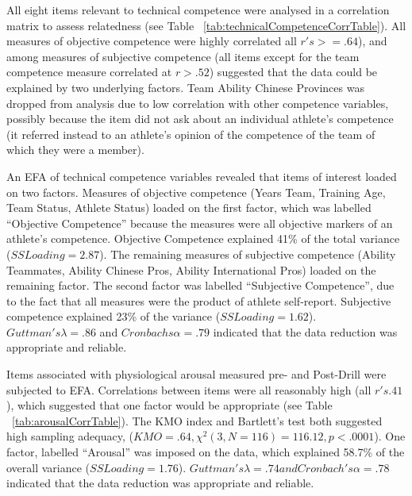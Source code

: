 All eight items relevant to technical competence were analysed in a correlation matrix to assess relatedness (see Table ~\ref{tab:technicalCompetenceCorrTable}). All measures of objective competence were highly correlated all $r's >= .64$),  and among measures of subjective competence (all items except for the team competence measure correlated at $r > .52$) suggested that the data could be explained by two underlying factors. Team Ability Chinese Provinces was dropped from analysis due to low correlation with other competence variables, possibly because the item did not ask about an individual athlete’s competence (it referred instead to an athlete’s opinion of the competence of the team of which they were a member).

An EFA of technical competence variables revealed that items of interest loaded on two factors. Measures of objective competence (Years Team, Training Age, Team Status, Athlete Status) loaded on the first factor, which was labelled ``Objective Competence'' because the measures were all objective markers of an athlete's competence.
Objective Competence explained 41\% of the total variance ($SS Loading = 2.87$).  The remaining measures of subjective competence (Ability Teammates, Ability Chinese Pros, Ability International Pros) loaded on the remaining factor.  The second factor was labelled ``Subjective Competence'', due to the fact that all measures were the product of athlete self-report.  Subjective competence explained 23\% of the variance ($SS Loading = 1.62$).  $Guttman's \lambda = .86$ and $Cronbachs \alpha = .79$ indicated that the data reduction was appropriate and reliable.

Items associated with physiological arousal measured pre- and Post-Drill were subjected to EFA.
Correlations between items were all reasonably high (all $r's  .41$), which suggested that one factor would be appropriate (see Table ~\ref{tab:arousalCorrTable}). The KMO index and Bartlett's test both suggested high sampling adequacy, ($KMO = .64, \chi^2(3, N = 116) = 116.12, p < .0001$).  One factor, labelled ``Arousal'' was imposed on the data, which explained 58.7\% of the overall variance ($SS Loading = 1.76$).  $Guttman's \lambda = .74 and  Cronbach's \alpha = .78$  indicated that the data reduction was appropriate and reliable.






